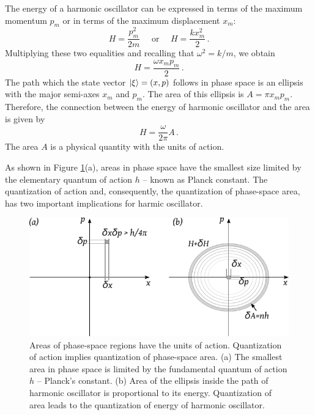 The energy of a harmonic oscillator can be expressed in terms of the maximum momentum $p_m$ or in terms of the maximum displacement $x_m$:
\[
H = \frac{p_m^2}{2m}\quad\textrm{ or }\quad H=\frac{kx_m^2}{2}\,.
\]
Multiplying these two equalities and recalling that $\omega^2=k/m$, we obtain
\[
H = \frac{\omega x_m p_m}{2}\,.
\]
The path which the state vector $|{\xi}\rangle=(x,p)$ follows in phase space is an ellipsis with the major semi-axes $x_m$ and $p_m$. The area of this ellipsis is $A=\pi x_m p_m$. Therefore, the connection between the energy of harmonic oscillator and the area is given by
\[
H=\frac{\omega}{2\pi}A\,.
\]
The area $A$ is a physical quantity with the units of action.

As shown in Figure \ref{fig:phaseSpaceQuantum}(a), areas in phase space have the smallest size limited by the elementary quantum of action $h$ -- known as Planck constant. The quantization of action and, consequently, the quantization of phase-space area, has two important implications for harmic oscillator.
\begin{figure}[htbp]
	\centering
	\includegraphics[scale=1.0]{phaseSpaceQuantum}
	\caption{Areas of phase-space regions have the units of action. Quantization of action implies quantization of phase-space area. (a) The smallest area in phase space is limited by the fundamental quantum of action $h$ -- Planck's constant. (b) Area of the ellipsis inside the path of harmonic oscillator is proportional to its energy. Quantization of area leads to the quantization of energy of harmonic oscillator.}
	\label{fig:phaseSpaceQuantum}
\end{figure}

